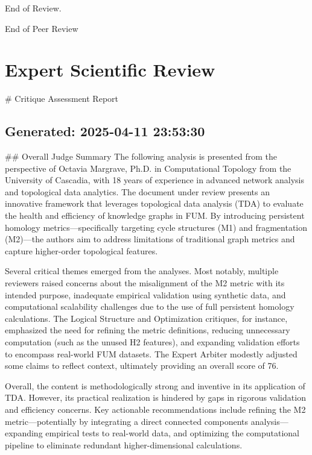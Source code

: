 \documentclass[12pt]{article}
\begin{document}
\hrulefill
End of Review.

\hrulefill
End of Peer Review


\section{Expert Scientific Review}
\# Critique Assessment Report
\subsection{\textbf{Generated:} 2025-04-11 23:53:30}
\#\# Overall Judge Summary
The following analysis is presented from the perspective of Octavia Margrave, Ph.D. in Computational Topology from the University of Cascadia, with 18 years of experience in advanced network analysis and topological data analytics. The document under review presents an innovative framework that leverages topological data analysis (TDA) to evaluate the health and efficiency of knowledge graphs in FUM. By introducing persistent homology metrics—specifically targeting cycle structures (M1) and fragmentation (M2)—the authors aim to address limitations of traditional graph metrics and capture higher-order topological features.

Several critical themes emerged from the analyses. Most notably, multiple reviewers raised concerns about the misalignment of the M2 metric with its intended purpose, inadequate empirical validation using synthetic data, and computational scalability challenges due to the use of full persistent homology calculations. The Logical Structure and Optimization critiques, for instance, emphasized the need for refining the metric definitions, reducing unnecessary computation (such as the unused H2 features), and expanding validation efforts to encompass real-world FUM datasets. The Expert Arbiter modestly adjusted some claims to reflect context, ultimately providing an overall score of 76.

Overall, the content is methodologically strong and inventive in its application of TDA. However, its practical realization is hindered by gaps in rigorous validation and efficiency concerns. Key actionable recommendations include refining the M2 metric—potentially by integrating a direct connected components analysis—expanding empirical tests to real-world data, and optimizing the computational pipeline to eliminate redundant higher-dimensional calculations.
\end{document}
